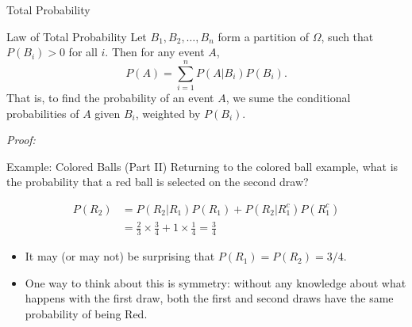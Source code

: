 \begin{frame}[allowframebreaks]{Total Probability}
  \begin{block}{Law of Total Probability}
    Let $B_1, B_2, \ldots, B_n$ form a partition of $\Omega$, such that $P(B_i) > 0$ for all $i$. Then for any event $A$,
    $$
    P(A) = \sum_{i = 1}^n P(A|B_i)P(B_i).
    $$
    That is, to find the probability of an event $A$, we sume the conditional probabilities of $A$ given $B_i$, weighted by $P(B_i)$.
  \end{block}
  
  \framebreak
  
  \emph{Proof:} 
  

  \framebreak
  
  \begin{exampleblock}{Example: Colored Balls (Part II)}
    Returning to the colored ball example, what is the probability that a red ball is selected on the second draw?
    
    \begin{align*}
    P(R_2) &= P(R_2 | R_1) P(R_1) + P(R_2 | R_1^c)P(R_1^c)\\
    &= \frac{2}{3}\times \frac{3}{4} + 1 \times \frac{1}{4} = \frac{3}{4}
    \end{align*}

  \end{exampleblock}

\begin{itemize}
  \item It may (or may not) be surprising that $P(R_1) = P(R_2) = 3/4$.
  \item One way to think about this is symmetry: without any knowledge about what happens with the first draw, both the first and second draws have the same probability of being Red. 
\end{itemize}

\end{frame}

